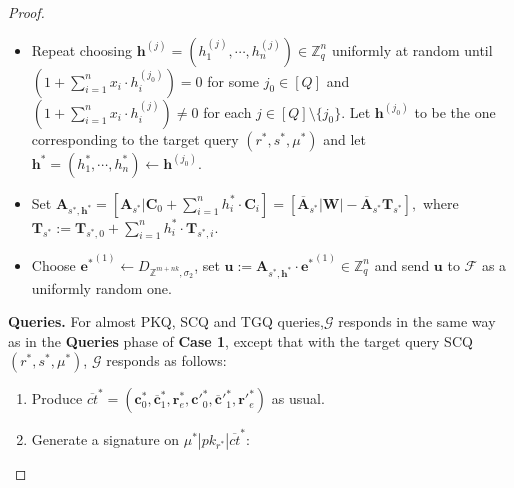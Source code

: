\documentclass[a4paper,11pt,onecolumn]{elsarticle}
\def\bf{\mathbf}
\begin{document}
\begin{proof}
\begin{itemize}
				\item Repeat choosing $\textbf{h}^{(j)}=(h^{(j)}_1, \cdots, h^{(j)}_{n})\in \mathbb{Z}_q^n$ uniformly at random until   $(1+\sum_{i=1}^{n}x_i \cdot h^{(j_0)}_i)= 0$ for some $ j_0 \in [Q]$ and  $(1+\sum_{i=1}^{n}x_i \cdot h^{(j)}_i)\neq 0$ for each $j \in [Q]\setminus \{j_0\}$. Let $\textbf{h}^{(j_0)}$ to be the one corresponding to the target query $(r^*,s^*, \mu^*)$ and let $\textbf{h}^*=(h_1^*,\cdots, h_n^*) \gets \textbf{h}^{(j_0)}$.
					
	
	\item  Set $\textbf{A}_{{s^*},\textbf{h}^*}=[\mathbf{A}_{s^*}|\mathbf{C}_0+\sum_{i=1}^{n}h^*_i\cdot \mathbf{C}_i]=[\overline{\textbf{A}}_{s^*}|\textbf{W}|-\overline{\textbf{A}}_{s^*}\textbf{T}_{s^*}],$ where $\textbf{T}_{s^*}:=\mathbf{T}_{s^*,0}+\sum_{i=1}^{n}h^*_i\cdot \mathbf{T}_{s^*,i}$.
			\item Choose ${\textbf{e}^*}^{(1)}  \leftarrow D_{\mathbb{Z}^{m+nk},\sigma_2}$, set $ \mathbf{u}:=\textbf{A}_{s^*,\textbf{h}^*}\cdot {\textbf{e}^*}^{(1)} \in \mathbb{Z}_q ^{n}$ and send $\textbf{u}$ to $\mathcal{F}$ as a uniformly random one. 

				
				\end{itemize}
			 \textbf{Queries.}  For almost PKQ,  SCQ and  TGQ queries,$\mathcal{G}$ responds in the same way as in the \textbf{Queries} phase of \textbf{Case 1}, except that  with the target query SCQ$(r^*,s^*,\mu^*)$, $\mathcal{G}$ responds as follows: 
		\begin{enumerate}
	
\item Produce $\overline{ct}^*=(\textbf{c}^*_0, \overline{\textbf{c}}^*_1, \textbf{r}^*_e, \textbf{c}'^*_0, \overline{\textbf{c}}'^*_1, \textbf{r}'^*_e)$ as usual.%
	\item Generate a signature on $\mu^*| pk_{r^*}|\overline{ct}^*$:
		\begin{enumerate}


\end{enumerate}
\end{enumerate}
\end{proof}
\end{document}
